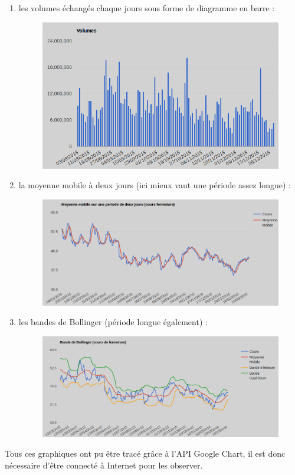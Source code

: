 \begin{enumerate}
\begin{enumerate}
	\item les volumes échangés chaque jours sous forme de diagramme en barre :
	  \begin{figure}[H]
	    \center
	    \includegraphics[scale=0.5]{../graph/6-historiquevolumes.png}
	  \end{figure}
	\newpage  
	\item la moyenne mobile à deux jours (ici mieux vaut une période assez longue) :
	  \begin{figure}[H]
	    \center
	    \includegraphics[scale=0.5]{../graph/6-historiqueMoyMob.png}
	  \end{figure}
	\item les bandes de Bollinger (période longue également) :
	  \begin{figure}[H]
	    \center
	    \includegraphics[scale=0.5]{../graph/6-historiqueBollinger.png} 
	  \end{figure}
      \end{enumerate}
      Tous ces graphiques ont pu être tracé grâce à l'API Google Chart, il est donc nécessaire d'être connecté à Internet pour les observer.
      
      \end{enumerate}
    
